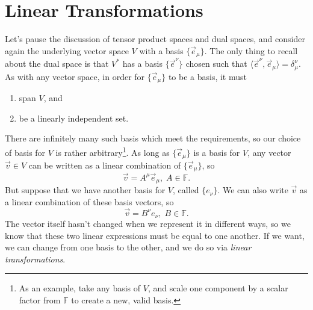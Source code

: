 \chapter{Linear Transformations}
Let's pause the discussion of tensor product spaces and dual spaces, and consider again the underlying vector space $V$ with a basis $\{\vec{e}_\mu\}$.
The only thing to recall about the dual space is that $V^*$ has a basis $\{\vec{e}^\nu\}$ chosen such that $\langle \vec{e}^\nu, \vec{e}_\mu \rangle = \delta^\nu_\mu$.
As with any vector space, in order for $\{\vec{e}_\mu\}$ to be a basis, it must
\begin{enumerate}
    \item span $V$, and
    \item be a linearly independent set.
\end{enumerate}
There are infinitely many such basis which meet the requirements, so our choice of basis for $V$ is rather arbitrary\footnote{As an example, take any basis of $V$, and scale one component by a scalar factor from $\mathbb{F}$ to create a new, valid basis.}.
As long as $\{\vec{e}_\mu\}$ is a basis for $V$, any vector $\vec{v} \in V$ can be written as a linear combination of $\{\vec{e}_\mu\}$, so
\[ \vec{v} = A^\mu \vec{e}_\mu,\;A \in \mathbb{F}. \]
But suppose that we have another basis for $V$, called $\{\unit{e}_\nu\}$.
We can also write $\vec{v}$ as a linear combination of these basis vectors,
so
\[ \vec{v} = B^\nu \unit{e}_\nu,\;B \in \mathbb{F}. \]
The vector itself hasn't changed when we represent it in different ways, so we know that these two linear expressions must be equal to one another.
If we want, we can change from one basis to the other, and we do so via \emph{linear transformations}.

